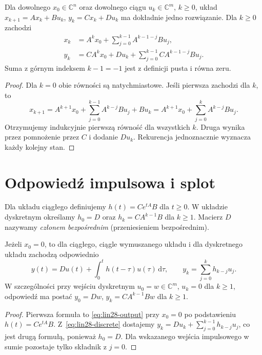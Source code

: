 \begin{twierdzenie}
\label{thm:lin28-discrete}
Dla dowolnego \(x_0\in\mathbb C^n\)
oraz dowolnego ciągu \(u_k\in\mathbb C^m\),
\(k\ge0\), układ
\(x_{k+1}=Ax_k+Bu_k\), \(y_k=Cx_k+Du_k\)
ma dokładnie jedno rozwiązanie. Dla \(k\ge0\)
zachodzi
\[
 \begin{aligned}
 x_k&=A^kx_0+\sum_{j=0}^{k-1}A^{k-1-j}Bu_j,\\
 y_k&=CA^kx_0+Du_k+
       \sum_{j=0}^{k-1}CA^{k-1-j}Bu_j.
 \end{aligned}
 \tag{28.3}\label{eq:lin28-discrete}
\]
Suma z górnym indeksem \(k-1=-1\)
jest z definicji pusta i równa zeru.
\end{twierdzenie}
\begin{proof}
Dla \(k=0\) obie równości są natychmiastowe.
Jeśli pierwsza zachodzi dla \(k\), to
\[
 x_{k+1}
 =A^{k+1}x_0+
   \sum_{j=0}^{k-1}A^{k-j}Bu_j+Bu_k
 =A^{k+1}x_0+\sum_{j=0}^{k}A^{k-j}Bu_j.
\]
Otrzymujemy indukcyjnie pierwszą równość
dla wszystkich \(k\). Druga wynika przez
pomnożenie przez \(C\) i dodanie \(Du_k\).
Rekurencja jednoznacznie wyznacza każdy kolejny stan.
\end{proof}

\section{Odpowiedź impulsowa i splot}
\label{sec:lin28-impulse}

\begin{definicja}
\label{def:lin28-kernel}
Dla układu ciągłego definiujemy
\(h(t)=Ce^{tA}B\) dla \(t\ge0\).
W układzie dyskretnym określamy
\(h_0=D\) oraz \(h_k=CA^{k-1}B\) dla \(k\ge1\).
Macierz \(D\) nazywamy
\emph{członem bezpośrednim} (przeniesieniem bezpośrednim).
\end{definicja}

\begin{twierdzenie}
\label{thm:lin28-convolution}
Jeżeli \(x_0=0\), to dla ciągłego, ciągle wymuszanego
układu i dla dyskretnego układu zachodzą odpowiednio
\[
 y(t)=Du(t)+\int_0^t h(t-\tau)u(\tau)\,\mathrm d\tau,
 \qquad
 y_k=\sum_{j=0}^{k}h_{k-j}u_j.
 \tag{28.4}\label{eq:lin28-convolution}
\]
W szczególności przy wejściu dyskretnym
\(u_0=w\in\mathbb C^m\), \(u_k=0\) dla \(k\ge1\),
odpowiedź ma postać
\(y_0=Dw\), \(y_k=CA^{k-1}Bw\) dla \(k\ge1\).
\end{twierdzenie}
\begin{proof}
Pierwsza formuła to
\eqref{eq:lin28-output} przy \(x_0=0\)
po podstawieniu \(h(t)=Ce^{tA}B\).
Z~\eqref{eq:lin28-discrete} dostajemy
\(y_k=Du_k+\sum_{j=0}^{k-1}h_{k-j}u_j\),
co jest drugą formułą, ponieważ \(h_0=D\).
Dla wskazanego wejścia impulsowego
w sumie pozostaje tylko składnik z \(j=0\).
\end{proof}

